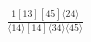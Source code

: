 \documentclass[varwidth, border=5pt]{standalone}
\begin{document}
\begin{my}
$\begin{gathered}
\scriptscriptstyle\frac{1[13][45]⟨24⟩}{⟨14⟩[14]⟨34⟩⟨45⟩}
\end{gathered}$
\end{my}
\end{document}
